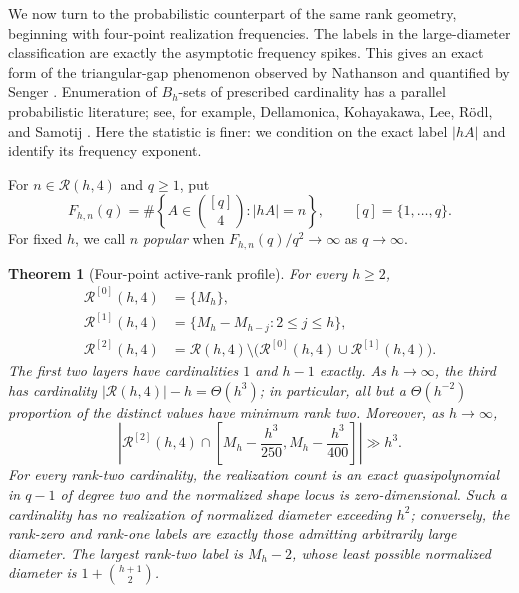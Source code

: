 \documentclass[11pt,reqno]{amsart}
\newtheorem{theorem}{Theorem}[section]
\theoremstyle{definition}
\theoremstyle{remark}
\newcommand{\Rcal}{\mathcal R}
\begin{document}
We now turn to the probabilistic counterpart of the same rank geometry,
beginning with four-point realization frequencies.  The labels in the
large-diameter classification are exactly the asymptotic frequency spikes.
This gives an exact form of the triangular-gap phenomenon observed by
Nathanson and quantified by Senger
\cite{NathansonTriangular,Senger2025}.
Enumeration of $B_h$-sets of prescribed cardinality has a parallel
probabilistic literature; see, for example, Dellamonica, Kohayakawa, Lee,
R\"odl, and Samotij \cite{DellamonicaEtAl2018}.  Here the statistic is finer:
we condition on the exact label $|hA|$ and identify its frequency exponent.

For $n\in\Rcal(h,4)$ and $q\geq1$, put
\[
 F_{h,n}(q)=\#\left\{A\in\binom{[q]}4:|hA|=n\right\},
 \qquad [q]=\{1,\ldots,q\}.
\]
For fixed $h$, we call $n$ \emph{popular} when
$F_{h,n}(q)/q^2\to\infty$ as $q\to\infty$.

\begin{theorem}[Four-point active-rank profile]
\label{thm:spectral-rank}
For every $h\geq2$,
\begin{align}
 \Rcal^{[0]}(h,4)&=\{M_h\},\label{eq:rankzero-spectrum}\\
 \Rcal^{[1]}(h,4)&=
 \{M_h-M_{h-j}:2\leq j\leq h\},\label{eq:rankone-spectrum}\\
 \Rcal^{[2]}(h,4)&=
 \Rcal(h,4)\setminus
 \bigl(\Rcal^{[0]}(h,4)\cup\Rcal^{[1]}(h,4)\bigr).
 \label{eq:ranktwo-spectrum}
\end{align}
The first two layers have cardinalities $1$ and $h-1$ exactly.  As
$h\to\infty$, the third has cardinality
$|\Rcal(h,4)|-h=\Theta(h^3)$; in particular, all but a
$\Theta(h^{-2})$ proportion of the distinct values have minimum rank two.
Moreover, as $h\to\infty$,
\[
 \left|\Rcal^{[2]}(h,4)\cap
 \left[M_h-\frac{h^3}{250},M_h-\frac{h^3}{400}\right]\right|
 \gg h^3.
\]
For every rank-two cardinality, the realization count is an exact
quasipolynomial in $q-1$ of degree two and the normalized shape locus is
zero-dimensional.  Such a cardinality has no realization of normalized
diameter exceeding $h^2$; conversely, the rank-zero and rank-one labels are
exactly those admitting arbitrarily large diameter.  The largest rank-two
label is $M_h-2$, whose least possible normalized diameter is
$1+\binom{h+1}{2}$.
\end{theorem}
\end{document}
